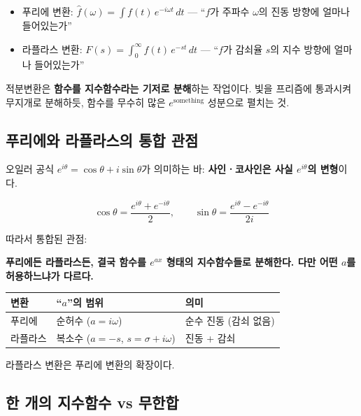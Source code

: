 \documentclass[11pt,a4paper]{article}
\begin{document}
\begin{itemize}
\item 푸리에 변환: $\hat{f}(\omega) = \int f(t)\, e^{-i\omega t}\, dt$ --- ``$f$가 주파수 $\omega$의 진동 방향에 얼마나 들어있는가''
\item 라플라스 변환: $F(s) = \int_0^\infty f(t)\, e^{-st}\, dt$ --- ``$f$가 감쇠율 $s$의 지수 방향에 얼마나 들어있는가''
\end{itemize}

적분변환은 \textbf{함수를 지수함수라는 기저로 분해}하는 작업이다. 빛을 프리즘에 통과시켜 무지개로 분해하듯, 함수를 무수히 많은 $e^{\text{something}}$ 성분으로 펼치는 것.

\subsection{푸리에와 라플라스의 통합 관점}

오일러 공식 $e^{i\theta} = \cos\theta + i\sin\theta$가 의미하는 바: \textbf{사인ㆍ코사인은 사실 $e^{i\theta}$의 변형}이다.

\begin{equation}
\cos\theta = \frac{e^{i\theta} + e^{-i\theta}}{2}, \qquad \sin\theta = \frac{e^{i\theta} - e^{-i\theta}}{2i}
\end{equation}

따라서 통합된 관점:

\begin{insightbox}
\textbf{푸리에든 라플라스든, 결국 함수를 $e^{ax}$ 형태의 지수함수들로 분해한다. 다만 어떤 $a$를 허용하느냐가 다르다.}

\begin{center}
\begin{tabular}{lll}
\toprule
변환 & ``$a$''의 범위 & 의미 \\
\midrule
푸리에 & 순허수 ($a = i\omega$) & 순수 진동 (감쇠 없음) \\
라플라스 & 복소수 ($a = -s$, $s = \sigma + i\omega$) & 진동 + 감쇠 \\
\bottomrule
\end{tabular}
\end{center}

라플라스 변환은 푸리에 변환의 확장이다.
\end{insightbox}

\subsection{한 개의 지수함수 vs 무한합}
\end{document}
